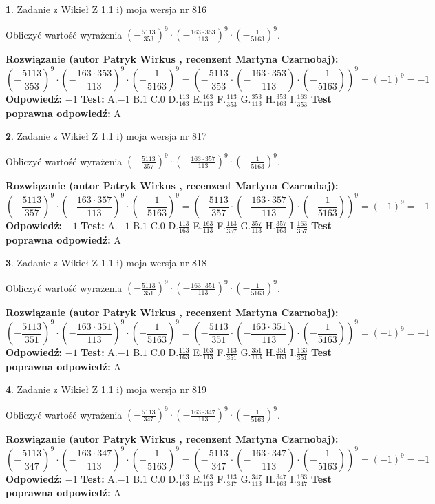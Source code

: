 \documentclass[12pt, a4paper]{article}
\theoremstyle{definition} %
\newtheorem{zad}{}
\newcommand{\zadStart}[1]{\begin{zad}#1\newline}
\newcommand{\zadStop}{\end{zad}}
\newcommand{\rozwStart}[2]{\noindent \textbf{Rozwiązanie (autor #1 , recenzent #2): }\newline}
\newcommand{\rozwStop}{\newline}
\newcommand{\odpStart}{\noindent \textbf{Odpowiedź:}\newline}
\newcommand{\odpStop}{\newline}
\newcommand{\testStart}{\noindent \textbf{Test:}\newline}
\newcommand{\testStop}{\newline}
\newcommand{\kluczStart}{\noindent \textbf{Test poprawna odpowiedź:}\newline}
\newcommand{\kluczStop}{\newline}
\begin{document}
\zadStart{Zadanie z Wikieł Z 1.1 i) moja wersja nr 816}

Obliczyć wartość wyrażenia $(-\frac{5113}{353})^{9} \cdot (-\frac{163 \cdot 353}{113})^{9} \cdot (-\frac{1}{5163})^{9}$.
\zadStop
\rozwStart{Patryk Wirkus}{Martyna Czarnobaj}
$$(-\frac{5113}{353})^{9} \cdot (-\frac{163 \cdot 353}{113})^{9} \cdot (-\frac{1}{5163})^{9} = (-\frac{5113}{353} \cdot (-\frac{163 \cdot 353}{113}) \cdot (-\frac{1}{5163}))^{9} = (-1)^{9} = -1$$
\rozwStop
\odpStart
$-1$
\odpStop
\testStart
A.$-1$ B.$1$ C.$0$ D.$\frac{113}{163}$ E.$\frac{163}{113}$
F.$\frac{113}{353}$ G.$\frac{353}{113}$
H.$\frac{353}{163}$
I.$\frac{163}{353}$
\testStop
\kluczStart
A
\kluczStop



\zadStart{Zadanie z Wikieł Z 1.1 i) moja wersja nr 817}

Obliczyć wartość wyrażenia $(-\frac{5113}{357})^{9} \cdot (-\frac{163 \cdot 357}{113})^{9} \cdot (-\frac{1}{5163})^{9}$.
\zadStop
\rozwStart{Patryk Wirkus}{Martyna Czarnobaj}
$$(-\frac{5113}{357})^{9} \cdot (-\frac{163 \cdot 357}{113})^{9} \cdot (-\frac{1}{5163})^{9} = (-\frac{5113}{357} \cdot (-\frac{163 \cdot 357}{113}) \cdot (-\frac{1}{5163}))^{9} = (-1)^{9} = -1$$
\rozwStop
\odpStart
$-1$
\odpStop
\testStart
A.$-1$ B.$1$ C.$0$ D.$\frac{113}{163}$ E.$\frac{163}{113}$
F.$\frac{113}{357}$ G.$\frac{357}{113}$
H.$\frac{357}{163}$
I.$\frac{163}{357}$
\testStop
\kluczStart
A
\kluczStop



\zadStart{Zadanie z Wikieł Z 1.1 i) moja wersja nr 818}

Obliczyć wartość wyrażenia $(-\frac{5113}{351})^{9} \cdot (-\frac{163 \cdot 351}{113})^{9} \cdot (-\frac{1}{5163})^{9}$.
\zadStop
\rozwStart{Patryk Wirkus}{Martyna Czarnobaj}
$$(-\frac{5113}{351})^{9} \cdot (-\frac{163 \cdot 351}{113})^{9} \cdot (-\frac{1}{5163})^{9} = (-\frac{5113}{351} \cdot (-\frac{163 \cdot 351}{113}) \cdot (-\frac{1}{5163}))^{9} = (-1)^{9} = -1$$
\rozwStop
\odpStart
$-1$
\odpStop
\testStart
A.$-1$ B.$1$ C.$0$ D.$\frac{113}{163}$ E.$\frac{163}{113}$
F.$\frac{113}{351}$ G.$\frac{351}{113}$
H.$\frac{351}{163}$
I.$\frac{163}{351}$
\testStop
\kluczStart
A
\kluczStop



\zadStart{Zadanie z Wikieł Z 1.1 i) moja wersja nr 819}

Obliczyć wartość wyrażenia $(-\frac{5113}{347})^{9} \cdot (-\frac{163 \cdot 347}{113})^{9} \cdot (-\frac{1}{5163})^{9}$.
\zadStop
\rozwStart{Patryk Wirkus}{Martyna Czarnobaj}
$$(-\frac{5113}{347})^{9} \cdot (-\frac{163 \cdot 347}{113})^{9} \cdot (-\frac{1}{5163})^{9} = (-\frac{5113}{347} \cdot (-\frac{163 \cdot 347}{113}) \cdot (-\frac{1}{5163}))^{9} = (-1)^{9} = -1$$
\rozwStop
\odpStart
$-1$
\odpStop
\testStart
A.$-1$ B.$1$ C.$0$ D.$\frac{113}{163}$ E.$\frac{163}{113}$
F.$\frac{113}{347}$ G.$\frac{347}{113}$
H.$\frac{347}{163}$
I.$\frac{163}{347}$
\testStop
\kluczStart
A
\kluczStop
\end{document}
